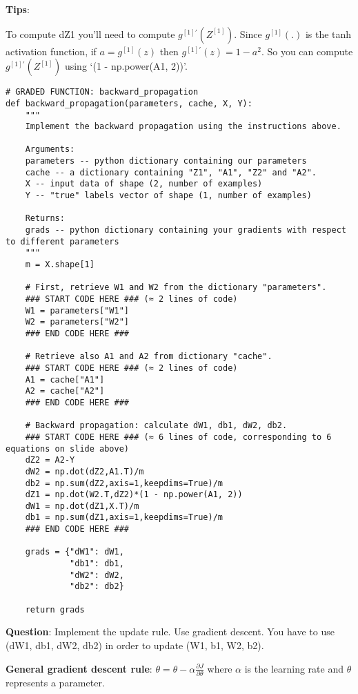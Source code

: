 {\textbf {Tips}}:

    To compute dZ1 you'll need to compute $g^{[1]'}(Z^{[1]})$. Since $g^{[1]}(.)$ is the tanh activation function, if $a = g^{[1]}(z)$ then $g^{[1]'}(z) = 1-a^2$. So you can compute $g^{[1]'}(Z^{[1]})$ using `(1 - np.power(A1, 2))'.

\begin{verbatim}
# GRADED FUNCTION: backward_propagation
def backward_propagation(parameters, cache, X, Y):
    """
    Implement the backward propagation using the instructions above.
    
    Arguments:
    parameters -- python dictionary containing our parameters 
    cache -- a dictionary containing "Z1", "A1", "Z2" and "A2".
    X -- input data of shape (2, number of examples)
    Y -- "true" labels vector of shape (1, number of examples)
    
    Returns:
    grads -- python dictionary containing your gradients with respect to different parameters
    """
    m = X.shape[1]
    
    # First, retrieve W1 and W2 from the dictionary "parameters".
    ### START CODE HERE ### (≈ 2 lines of code)
    W1 = parameters["W1"]
    W2 = parameters["W2"]
    ### END CODE HERE ###
        
    # Retrieve also A1 and A2 from dictionary "cache".
    ### START CODE HERE ### (≈ 2 lines of code)
    A1 = cache["A1"]
    A2 = cache["A2"]
    ### END CODE HERE ###
    
    # Backward propagation: calculate dW1, db1, dW2, db2. 
    ### START CODE HERE ### (≈ 6 lines of code, corresponding to 6 equations on slide above)
    dZ2 = A2-Y
    dW2 = np.dot(dZ2,A1.T)/m
    db2 = np.sum(dZ2,axis=1,keepdims=True)/m
    dZ1 = np.dot(W2.T,dZ2)*(1 - np.power(A1, 2))
    dW1 = np.dot(dZ1,X.T)/m
    db1 = np.sum(dZ1,axis=1,keepdims=True)/m
    ### END CODE HERE ###
    
    grads = {"dW1": dW1,
             "db1": db1,
             "dW2": dW2,
             "db2": db2}
    
    return grads
\end{verbatim}


{\textbf {Question}}: Implement the update rule. Use gradient descent. You have to use (dW1, db1, dW2, db2) in order to update (W1, b1, W2, b2).

{\textbf {General gradient descent rule}}: $ \theta = \theta - \alpha \frac{\partial J }{ \partial \theta }$ where $\alpha$ is the learning rate and $\theta$ represents a parameter.



